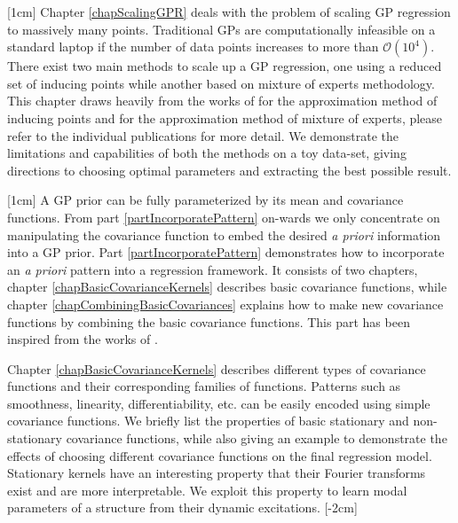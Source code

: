 [1cm]
Chapter \ref{chapScalingGPR} deals with the problem of scaling GP regression to massively many points. Traditional GPs are computationally infeasible on a standard laptop if the number of data points increases to more than $\mathcal{O}(10^4)$. There exist two main methods to scale up a GP regression, one using a reduced set of inducing points while another based on mixture of experts methodology. This chapter draws heavily from the works of \cite{quinonero2005unifying, seeger2003fast, Snelson06sparsegaussian, Titsias09variationallearning} for the approximation method of inducing points and \cite{caoF14, tresp2000bayesian, chen2009bagging, deisenroth2015distributed} for the approximation method of mixture of experts, please refer to the individual publications for more detail. We demonstrate the limitations and capabilities of both the methods on a toy data-set, giving directions to choosing optimal parameters and extracting the best possible result.  

[1cm]
A GP prior can be fully parameterized by its mean and covariance functions. From part \ref{partIncorporatePattern} on-wards we only concentrate on manipulating the covariance function to embed the desired \textit{a priori} information into a GP prior. Part \ref{partIncorporatePattern} demonstrates how to incorporate an \textit{a priori} pattern into a regression framework. It consists of two chapters, chapter \ref{chapBasicCovarianceKernels} describes basic covariance functions, while chapter \ref{chapCombiningBasicCovariances} explains how to make new covariance functions by combining the basic covariance functions. This part has been inspired from the works of \cite{bishop2006pattern, mackay2003information, duvenaud-thesis-2014, wilson2014thesis, lloyd2014automatic, durrande2001etude, durrande2013anova}. 

Chapter \ref{chapBasicCovarianceKernels} describes different types of covariance functions and their corresponding families of functions. Patterns such as smoothness, linearity, differentiability, etc. can be easily encoded using simple covariance functions. We briefly list the properties of basic stationary and non-stationary covariance functions, while also giving an example to demonstrate the effects of choosing different covariance functions on the final regression model. Stationary kernels have an interesting property that their Fourier transforms exist and are more interpretable. We exploit this property to learn modal parameters of a structure from their dynamic excitations. 
[-2cm]


